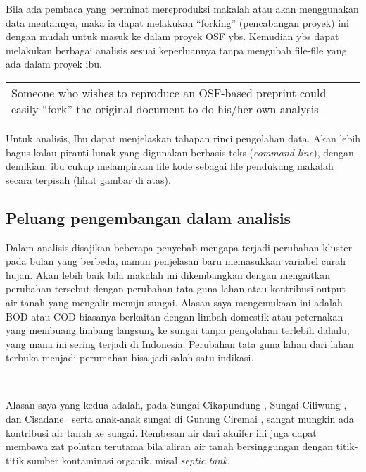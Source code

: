 \documentclass[10pt]{article}
\let\cite\citep
\renewenvironment{quote}
  {\begin{tabular}{|p{13cm}}}
  {\end{tabular}}
\providecommand\citep{\cite}
\begin{document}
\par\null

Bila ada pembaca yang berminat mereproduksi makalah atau akan
menggunakan data mentahnya, maka ia dapat melakukan ``forking''
(pencabangan proyek) ini dengan mudah untuk masuk ke dalam proyek OSF
ybs. Kemudian ybs dapat melakukan berbagai analisis sesuai keperluannya
tanpa mengubah file-file yang ada dalam proyek ibu.

\par\null

\begin{quote}
Someone who wishes to reproduce an OSF-based preprint could easily
``fork'' the original document to do his/her own analysis
\end{quote}

\par\null

Untuk analisis, Ibu dapat menjelaskan tahapan rinci pengolahan data.
Akan lebih bagus kalau piranti lunak yang digunakan berbasis teks
(\emph{command line}), dengan demikian, ibu cukup melampirkan file kode
sebagai file pendukung makalah secara terpisah (lihat gambar di atas).

\par\null

\subsection*{Peluang pengembangan dalam
analisis}

{\label{473265}}

Dalam analisis disajikan beberapa penyebab mengapa terjadi perubahan
kluster pada bulan yang berbeda, namun penjelasan baru memasukkan
variabel curah hujan. Akan lebih baik bila makalah ini dikembangkan
dengan mengaitkan perubahan tersebut dengan perubahan tata guna lahan
atau kontribusi output air tanah yang mengalir menuju sungai. Alasan
saya mengemukaan ini adalah BOD atau COD biasanya berkaitan dengan
limbah domestik atau peternakan yang membuang limbang langsung ke sungai
tanpa pengolahan terlebih dahulu, yang mana ini sering terjadi di
Indonesia. Perubahan tata guna lahan dari lahan terbuka menjadi
perumahan bisa jadi salah satu indikasi.

~

Alasan saya yang kedua adalah, pada Sungai Cikapundung
\cite{Darul_2015}, Sungai Ciliwung \cite{Irawan_2014}, dan
Cisadane~\cite{julian2016} serta anak-anak sungai di Gunung Ciremai
\cite{Irawan_2009}, sangat mungkin ada kontribusi air tanah ke sungai.
Rembesan air dari akuifer ini juga dapat membawa zat polutan terutama
bila aliran air tanah bersinggungan dengan titik-titik sumber
kontaminasi organik, misal \emph{septic tank}.~ ~
\end{document}
